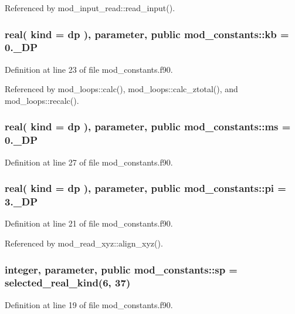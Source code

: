 Referenced by mod\+\_\+input\+\_\+read\+::read\+\_\+input().

\subsubsection[{\texorpdfstring{kb}{kb}}]{\setlength{\rightskip}{0pt plus 5cm}real( kind = {\bf dp} ), parameter, public mod\+\_\+constants\+::kb = 0.\+\_\+\+DP}\hypertarget{namespacemod__constants_af84a9ff68ff16d57560ea196b8e560d4}{}\label{namespacemod__constants_af84a9ff68ff16d57560ea196b8e560d4}


Definition at line 23 of file mod\+\_\+constants.\+f90.



Referenced by mod\+\_\+loops\+::calc(), mod\+\_\+loops\+::calc\+\_\+ztotal(), and mod\+\_\+loops\+::recalc().

\subsubsection[{\texorpdfstring{ms}{ms}}]{\setlength{\rightskip}{0pt plus 5cm}real( kind = {\bf dp} ), parameter, public mod\+\_\+constants\+::ms = 0.\+\_\+\+DP}\hypertarget{namespacemod__constants_ab31d074fb8a49a9991d7d6e3d4904d59}{}\label{namespacemod__constants_ab31d074fb8a49a9991d7d6e3d4904d59}


Definition at line 27 of file mod\+\_\+constants.\+f90.

\subsubsection[{\texorpdfstring{pi}{pi}}]{\setlength{\rightskip}{0pt plus 5cm}real( kind = {\bf dp} ), parameter, public mod\+\_\+constants\+::pi = 3.\+\_\+\+DP}\hypertarget{namespacemod__constants_a04c6845722711f5522458ed34969cdc3}{}\label{namespacemod__constants_a04c6845722711f5522458ed34969cdc3}


Definition at line 21 of file mod\+\_\+constants.\+f90.



Referenced by mod\+\_\+read\+\_\+xyz\+::align\+\_\+xyz().

\subsubsection[{\texorpdfstring{sp}{sp}}]{\setlength{\rightskip}{0pt plus 5cm}integer, parameter, public mod\+\_\+constants\+::sp = selected\+\_\+real\+\_\+kind(6, 37)}\hypertarget{namespacemod__constants_af0d7aefb6fb852492ee0db77744a412d}{}\label{namespacemod__constants_af0d7aefb6fb852492ee0db77744a412d}


Definition at line 19 of file mod\+\_\+constants.\+f90.


